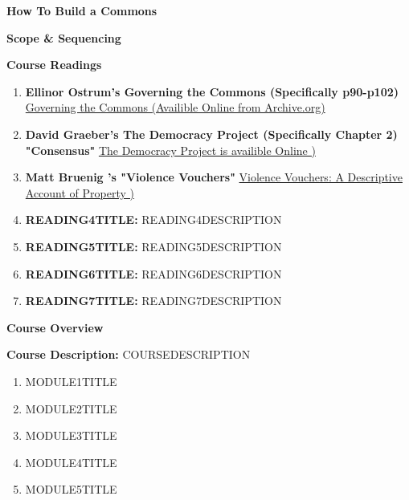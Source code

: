 \documentclass{article}
\begin{document}
	
{\huge \textbf{How To Build a Commons}}

\vspace{1cm}

{\Large \textbf{Scope \& Sequencing}}

\vspace{1cm}

{\huge \textbf{Course Readings}}

\begin{enumerate}
	
	\item \textbf{ Ellinor Ostrum's Governing the Commons (Specifically p90-p102) } \href{https://archive.org/details/governingthecommons}{Governing the Commons (Availible Online from Archive.org)}
	
	\item \textbf{David Graeber's The Democracy Project (Specifically Chapter 2)  "Consensus"} \href{https://theanarchistlibrary.org/library/david-graeber-the-democracy-project#toc21}{The Democracy Project is availible Online )}
	
	\item \textbf{Matt Bruenig 's "Violence Vouchers"} \href{	https://mattbruenig.com/2014/03/28/violence-vouchers-a-descriptive-account-of-property/}{Violence Vouchers: A Descriptive Account of Property )}
	
	\item \textbf{READING4TITLE:} READING4DESCRIPTION
	
	\item \textbf{READING5TITLE:} READING5DESCRIPTION
	
	\item \textbf{READING6TITLE:} READING6DESCRIPTION
	
	\item \textbf{READING7TITLE:} READING7DESCRIPTION
	
\end{enumerate}

\pagebreak

{\huge \textbf{Course Overview}}
\vspace{1cm}

\textbf{Course Description:} COURSEDESCRIPTION

\begin{enumerate}
\item MODULE1TITLE

\item MODULE2TITLE

\item MODULE3TITLE

\item MODULE4TITLE

\item MODULE5TITLE
\end{enumerate}
\end{document}
